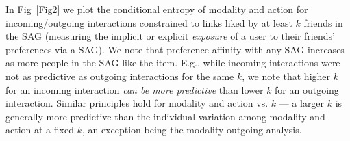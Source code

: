 In Fig~\ref{Fig2} we plot the conditional entropy of modality and
action for incoming/outgoing interactions constrained to links liked
by at least $k$ friends in the SAG (measuring the implicit or explicit
\emph{exposure} of a user to their friends' preferences via a SAG).
We note that preference affinity with any 
SAG increases as more people in the SAG like the item.  E.g., while incoming
interactions were not as predictive as outgoing interactions for the
same $k$, we note that higher $k$ for an incoming interaction
\emph{can be more predictive} than lower $k$ for an outgoing
interaction.  Similar principles hold for modality and action vs. $k$
--- a larger $k$ is generally more predictive than the individual
variation among modality and action at a fixed $k$, an exception
being the modality-outgoing analysis.


